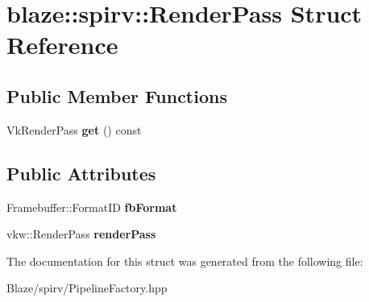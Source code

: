 \hypertarget{structblaze_1_1spirv_1_1RenderPass}{}\section{blaze\+:\+:spirv\+:\+:Render\+Pass Struct Reference}
\label{structblaze_1_1spirv_1_1RenderPass}
\subsection*{Public Member Functions}
\begin{DoxyCompactItemize}
\item 
\mbox{\label{structblaze_1_1spirv_1_1RenderPass_a8da5fb9d263414f56ea195869d90ba1e}} 
Vk\+Render\+Pass {\bfseries get} () const
\end{DoxyCompactItemize}
\subsection*{Public Attributes}
\begin{DoxyCompactItemize}
\item 
\mbox{\label{structblaze_1_1spirv_1_1RenderPass_acd04018e471fa9d900219fb67cc563ca}} 
Framebuffer\+::\+Format\+ID {\bfseries fb\+Format}
\item 
\mbox{\label{structblaze_1_1spirv_1_1RenderPass_abadce9b5d140e20e3fbf17bea4e62ff9}} 
vkw\+::\+Render\+Pass {\bfseries render\+Pass}
\end{DoxyCompactItemize}


The documentation for this struct was generated from the following file\+:\begin{DoxyCompactItemize}
\item 
Blaze/spirv/Pipeline\+Factory.\+hpp\end{DoxyCompactItemize}
